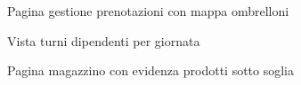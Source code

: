 \begin{figure}[H]
  \centering
  \caption{Pagina gestione prenotazioni con mappa ombrelloni}
  \label{fig:screen-prenotazioni}
\end{figure}

\begin{figure}[H]
  \centering
  \caption{Vista turni dipendenti per giornata}
  \label{fig:screen-turni}
\end{figure}

\begin{figure}[H]
  \centering
  \caption{Pagina magazzino con evidenza prodotti sotto soglia}
  \label{fig:screen-magazzino}
\end{figure}
